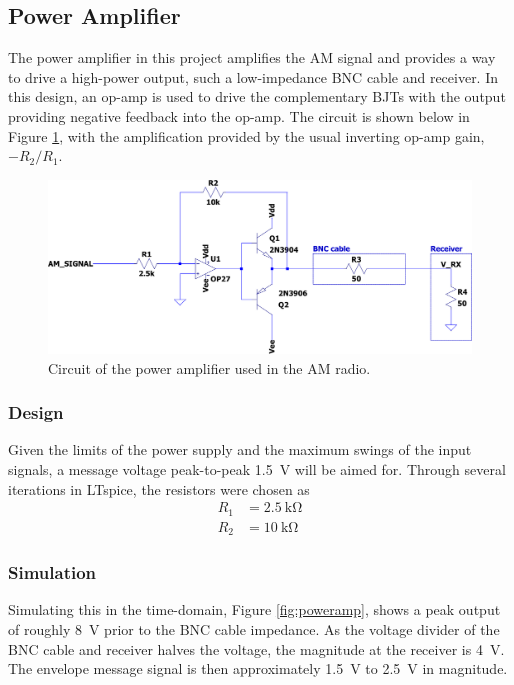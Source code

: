 \documentclass[11pt,letter,notitlepage]{article}
\begin{document}
	\subsection{Power Amplifier}
	The power amplifier in this project amplifies the AM signal and provides a way to drive a high-power output, such a low-impedance BNC cable and receiver. In this design, an op-amp is used to drive the complementary BJTs with the output providing negative feedback into the op-amp. The circuit is shown below in Figure \ref{fig:powerampckt-crop}, with the amplification provided by the usual inverting op-amp gain, $-R_2 / R_1$.
	
	\begin{figure}[h]
		\centering
		\includegraphics[width=0.7\linewidth]{poweramp/powerampckt-crop}
		\caption{Circuit of the power amplifier used in the AM radio.}
		\label{fig:powerampckt-crop}
	\end{figure}
	
	\subsubsection{Design}
	Given the limits of the power supply and the maximum swings of the input signals, a message voltage peak-to-peak \SI{1.5}{\V} will be aimed for. Through several iterations in LTspice, the resistors were chosen as \begin{align*}
		R_1 & = \SI{2.5}{\kohm} \\
		R_2 & = \SI{10}{\kohm}
	\end{align*}
	
	\subsubsection{Simulation}
	Simulating this in the time-domain, Figure \ref{fig:poweramp}, shows a peak output of roughly \SI{8}{\V} prior to the BNC cable impedance. As the voltage divider of the BNC cable and receiver halves the voltage, the magnitude at the receiver is \SI{4}{\V}. The envelope message signal is then approximately \SI{1.5}{\V} to \SI{2.5}{\V} in magnitude.
	
\end{document}
